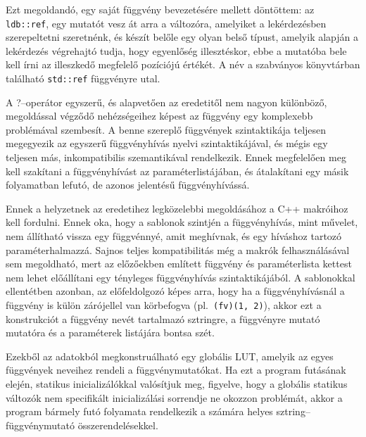 Ezt megoldandó, egy saját függvény bevezetésére mellett döntöttem:
az \texttt{ldb::ref}, egy mutatót vesz át arra a változóra, amelyiket a lekérdezésben szerepeltetni szeretnénk, és készít belőle egy olyan belső típust, amelyik alapján a lekérdezés végrehajtó tudja, hogy egyenlőség illesztéskor, ebbe a mutatóba bele kell írni az illeszkedő \nes{} megfelelő pozíciójú értékét.
A név a szabványos könyvtárban található \texttt{std::ref} függvényre utal.

A ?--operátor egyszerű, és alapvetően az eredetitől nem nagyon különböző, megoldással végződő nehézségeihez képest az  függvény egy komplexebb problémával szembesít.
A benne szereplő függvények szintaktikája teljesen megegyezik az egyszerű függvényhívás nyelvi szintaktikájával, és mégis egy teljesen más, inkompatibilis szemantikával rendelkezik.
Ennek megfelelően meg kell szakítani a függvényhívást az  paraméterlistájában, és átalakítani egy másik folyamatban lefutó, de azonos jelentésű függvényhívássá.

Ennek a helyzetnek az eredetihez legközelebbi megoldásához a C++ makróihoz kell fordulni.
Ennek oka, hogy a sablonok szintjén a függvényhívás, mint művelet,
nem állítható vissza egy függvénnyé, amit meghívnak, és egy híváshoz tartozó paraméterhalmazzá.
Sajnos teljes kompatibilitás még a makrók felhasználásával sem megoldható, mert az előzőekben említett függvény és paraméterlista kettest nem lehet előállítani egy tényleges függvényhívás szintaktikájából.
A sablonokkal ellentétben azonban, az előfeldolgozó képes arra, hogy ha a függvényhívásnál a függvény is külön zárójellel van körbefogva (pl.\ \texttt{(fv)(1, 2)}), akkor ezt a konstrukciót a függvény nevét tartalmazó sztringre, a függvényre mutató mutatóra és a paraméterek listájára bontsa szét.

Ezekből az adatokból megkonstruálható egy globális {\ac{LUT}}, amelyik az egyes függvények neveihez rendeli a függvénymutatókat.
Ha ezt a program futásának elején, statikus inicializálókkal valósítjuk meg, figyelve, hogy a globális statikus változók nem specifikált inicializálási sorrendje ne okozzon problémát, akkor a program bármely futó folyamata rendelkezik a számára helyes sztring--függvénymutató összerendelésekkel.

